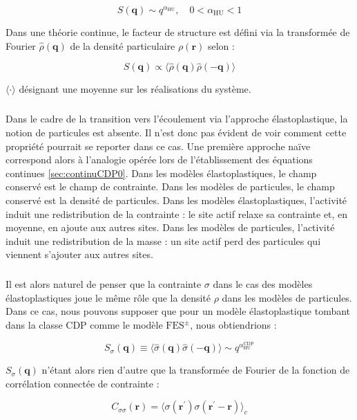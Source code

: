 \begin{equation}
	S(\mathbf{q})\sim q^{\alpha_\text{HU}}, \quad 0<\alpha_\text{HU}<1
\end{equation}

\noindent Dans une théorie continue, le facteur de structure est défini via la transformée de Fourier $\hat{\rho}(\mathbf{q})$ de la densité particulaire $\rho(\mathbf{r})$ selon :

\begin{equation}
	S(\mathbf{q}) \propto  \langle \hat{\rho}(\mathbf{q})\hat{\rho}(\mathbf{-q}) \rangle
\end{equation}

\noindent $\langle \cdot \rangle$ désignant une moyenne sur les réalisations du système.

\subparagraph{}Dans le cadre de la transition vers l'écoulement via l'approche élastoplastique, la notion de particules est absente. Il n'est donc pas évident de voir comment cette propriété pourrait se reporter dans ce cas. Une première approche naïve correspond alors à l'analogie opérée lors de l'établissement des équations continues \autoref{sec:continuCDP0}. Dans les modèles élastoplastiques, le champ conservé est le champ de contrainte. Dans les modèles de particules, le champ conservé est la densité de particules. Dans les modèles élastoplastiques, l'activité induit une redistribution de la contrainte : le site actif relaxe sa contrainte et, en moyenne, en ajoute aux autres sites. Dans les modèles de particules, l'activité induit une redistribution de la masse : un site actif perd des particules qui viennent s'ajouter aux autres sites.

\subparagraph{}Il est alors naturel de penser que la contrainte $\sigma$ dans le cas des modèles élastoplastiques joue le même rôle que la densité $\rho$ dans les modèles de particules. Dans ce cas, nous pouvons supposer que pour un modèle élastoplastique tombant dans la classe CDP comme le modèle $\text{FES}^\pm$, nous obtiendrions :

\begin{equation}
	S_\sigma(\mathbf{q}) \equiv \langle\hat{\sigma}(\mathbf{q})\hat{\sigma}(\mathbf{-q})\rangle \sim q^{\alpha_\text{HU}^\text{CDP}}
\end{equation}

\noindent $S_\sigma(\mathbf{q})$ n'étant alors rien d'autre que la transformée de Fourier de la fonction de corrélation connectée de contrainte :

\begin{equation}
	C_{\sigma\sigma}(\mathbf{r}) = \langle \sigma(\mathbf{r^\prime})\sigma(\mathbf{\mathbf{r}^\prime-\mathbf{r}})\rangle_c
\end{equation}

